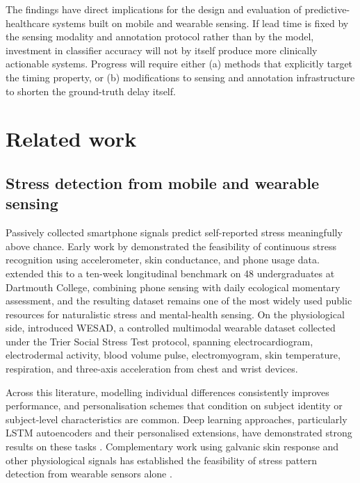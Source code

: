 \documentclass[preprint,12pt,authoryear]{elsarticle}
\begin{document}
The findings have direct implications for the design and evaluation of
predictive-healthcare systems built on mobile and wearable sensing. If
lead time is fixed by the sensing modality and annotation protocol
rather than by the model, investment in classifier accuracy will not
by itself produce more clinically actionable systems. Progress will
require either (a) methods that explicitly target the timing property,
or (b) modifications to sensing and annotation infrastructure to
shorten the ground-truth delay itself.

\section{Related work}

\subsection{Stress detection from mobile and wearable sensing}

Passively collected smartphone signals predict self-reported stress
meaningfully above chance. Early work by
\citet{sano2013} demonstrated the feasibility of continuous stress
recognition using accelerometer, skin conductance, and phone usage
data. \citet{wang2014} extended this to a ten-week longitudinal
benchmark on 48 undergraduates at Dartmouth College, combining phone
sensing with daily ecological momentary assessment, and the resulting
dataset remains one of the most widely used public resources for
naturalistic stress and mental-health sensing. On the physiological
side, \citet{schmidt2018} introduced WESAD, a controlled multimodal
wearable dataset collected under the Trier Social Stress Test protocol,
spanning electrocardiogram, electrodermal activity, blood volume pulse,
electromyogram, skin temperature, respiration, and three-axis
acceleration from chest and wrist devices.

Across this literature, modelling individual differences consistently
improves performance, and personalisation schemes that condition on
subject identity or subject-level characteristics are common. Deep
learning approaches, particularly LSTM autoencoders and their
personalised extensions, have demonstrated strong results on these
tasks \citep{iflrepo,hovsepian2015,taylor2020}. Complementary work
using galvanic skin response and other physiological signals has
established the feasibility of stress pattern detection from wearable
sensors alone \citep{bakker2011,gjoreski2016}.
\end{document}
